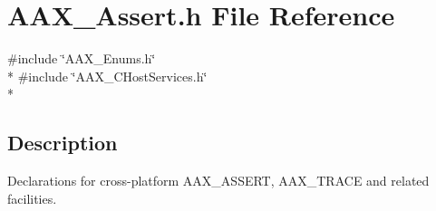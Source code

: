 \hypertarget{a00158}{}\section{A\+A\+X\+\_\+\+Assert.\+h File Reference}
\label{a00158}
{\ttfamily \#include \char`\"{}A\+A\+X\+\_\+\+Enums.\+h\char`\"{}}\\*
{\ttfamily \#include \char`\"{}A\+A\+X\+\_\+\+C\+Host\+Services.\+h\char`\"{}}\\*


\subsection{Description}
Declarations for cross-\/platform A\+A\+X\+\_\+\+A\+S\+S\+E\+R\+T, A\+A\+X\+\_\+\+T\+R\+A\+C\+E and related facilities. 


